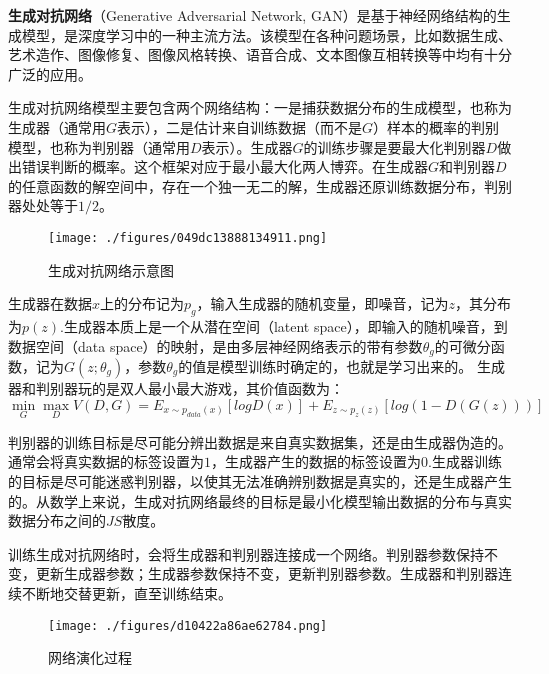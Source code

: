 
\textbf{生成对抗网络}（Generative Adversarial Network, GAN）是基于神经网络结构的生成模型，是深度学习中的一种主流方法。该模型在各种问题场景，比如数据生成、艺术造作、图像修复、图像风格转换、语音合成、文本图像互相转换等中均有十分广泛的应用。

生成对抗网络模型主要包含两个网络结构：一是捕获数据分布的生成模型，也称为生成器（通常用$G$表示），二是估计来自训练数据（而不是$G$）样本的概率的判别模型，也称为判别器（通常用$D$表示）。生成器$G$的训练步骤是要最大化判别器$D$做出错误判断的概率。这个框架对应于最小最大化两人博弈。在生成器$G$和判别器$D$的任意函数的解空间中，存在一个独一无二的解，生成器还原训练数据分布，判别器处处等于$1/2$。

\begin{figure}[ht]
\centering
\texttt{[image: ./figures/049dc13888134911.png]}
\caption{生成对抗网络示意图} \label{fig_GAN_2}
\end{figure}

生成器在数据$x$上的分布记为$p_g$，输入生成器的随机变量，即噪音，记为$z$，其分布为$p(z)$.生成器本质上是一个从潜在空间（latent space），即输入的随机噪音，到数据空间（data space）的映射，是由多层神经网络表示的带有参数$\theta_g$的可微分函数，记为$G(z;\theta_g)$，参数$\theta_g$的值是模型训练时确定的，也就是学习出来的。
生成器和判别器玩的是双人最小最大游戏，其价值函数为：
\begin{equation}
\mathop{\min}\limits_G \mathop {\max }\limits_D V(D,G)=E_{x\sim p_{data}(x)}[logD(x)]+E_{z\sim p_z(z)}[log(1-D(G(z)))]
\end{equation}


判别器的训练目标是尽可能分辨出数据是来自真实数据集，还是由生成器伪造的。通常会将真实数据的标签设置为$1$，生成器产生的数据的标签设置为$0$.生成器训练的目标是尽可能迷惑判别器，以使其无法准确辨别数据是真实的，还是生成器产生的。从数学上来说，生成对抗网络最终的目标是最小化模型输出数据的分布与真实数据分布之间的$JS$散度。

训练生成对抗网络时，会将生成器和判别器连接成一个网络。判别器参数保持不变，更新生成器参数；生成器参数保持不变，更新判别器参数。生成器和判别器连续不断地交替更新，直至训练结束。
\begin{figure}[ht]
\centering
\texttt{[image: ./figures/d10422a86ae62784.png]}
\caption{网络演化过程} \label{fig_GAN_1}
\end{figure}

